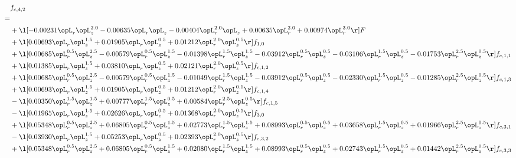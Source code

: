 \begin{alignat}{2} 
\label{eq:f_42_1} 
& f_{c,4,2} \nonumber \\ 
 = \\ 
& + \l[  -0.00231 \opL_r \opL_z^{2.0}   -0.00635 \opL_r \opL_z   -0.00404 \opL_r^{2.0} \opL_z +  0.00635 \opL_r^{2.0} +  0.00974 \opL_r^{3.0}  \r] F \nonumber \\ 
& + \l[  0.00693 \opL_r \opL_z^{1.5} +  0.01905 \opL_r \opL_z^{0.5} +  0.01212 \opL_r^{2.0} \opL_z^{0.5}  \r] f_{1,0} \nonumber \\ 
& + \l[  0.00685 \opL_r^{0.5} \opL_z^{2.5}   -0.00579 \opL_r^{0.5} \opL_z^{1.5}   -0.01398 \opL_r^{1.5} \opL_z^{1.5}   -0.03912 \opL_r^{0.5} \opL_z^{0.5}   -0.03106 \opL_r^{1.5} \opL_z^{0.5}   -0.01753 \opL_r^{2.5} \opL_z^{0.5}  \r] f_{c,1,1} \nonumber \\ 
& + \l[  0.01385 \opL_r \opL_z^{1.5} +  0.03810 \opL_r \opL_z^{0.5} +  0.02121 \opL_r^{2.0} \opL_z^{0.5}  \r] f_{c,1,2} \nonumber \\ 
& + \l[  0.00685 \opL_r^{0.5} \opL_z^{2.5}   -0.00579 \opL_r^{0.5} \opL_z^{1.5}   -0.01049 \opL_r^{1.5} \opL_z^{1.5}   -0.03912 \opL_r^{0.5} \opL_z^{0.5}   -0.02330 \opL_r^{1.5} \opL_z^{0.5}   -0.01285 \opL_r^{2.5} \opL_z^{0.5}  \r] f_{c,1,3} \nonumber \\ 
& + \l[  0.00693 \opL_r \opL_z^{1.5} +  0.01905 \opL_r \opL_z^{0.5} +  0.01212 \opL_r^{2.0} \opL_z^{0.5}  \r] f_{c,1,4} \nonumber \\ 
& - \l[  0.00350 \opL_r^{1.5} \opL_z^{1.5} +  0.00777 \opL_r^{1.5} \opL_z^{0.5} +  0.00584 \opL_r^{2.5} \opL_z^{0.5}  \r] f_{c,1,5} \nonumber \\ 
& - \l[  0.01965 \opL_r \opL_z^{1.5} +  0.02626 \opL_r \opL_z^{0.5} +  0.01368 \opL_r^{2.0} \opL_z^{0.5}  \r] f_{3,0} \nonumber \\ 
& + \l[  0.05348 \opL_r^{0.5} \opL_z^{2.5} +  0.06805 \opL_r^{0.5} \opL_z^{1.5} +  0.02773 \opL_r^{1.5} \opL_z^{1.5} +  0.08993 \opL_r^{0.5} \opL_z^{0.5} +  0.03658 \opL_r^{1.5} \opL_z^{0.5} +  0.01966 \opL_r^{2.5} \opL_z^{0.5}  \r] f_{c,3,1} \nonumber \\ 
& - \l[  0.03930 \opL_r \opL_z^{1.5} +  0.05253 \opL_r \opL_z^{0.5} +  0.02393 \opL_r^{2.0} \opL_z^{0.5}  \r] f_{c,3,2} \nonumber \\ 
& + \l[  0.05348 \opL_r^{0.5} \opL_z^{2.5} +  0.06805 \opL_r^{0.5} \opL_z^{1.5} +  0.02080 \opL_r^{1.5} \opL_z^{1.5} +  0.08993 \opL_r^{0.5} \opL_z^{0.5} +  0.02743 \opL_r^{1.5} \opL_z^{0.5} +  0.01442 \opL_r^{2.5} \opL_z^{0.5}  \r] f_{c,3,3} \nonumber \\ 

\end{alignat}
